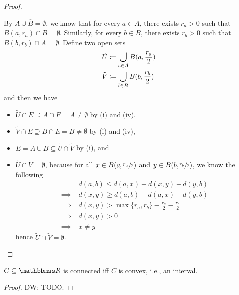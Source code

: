 \documentclass[screen,single]{techreport}
\numberwithin{equation}{section}
\newcommand{\diw}[1]{{\color{Red} DW: #1}}
\begin{document}
\begin{proof}
\begin{itemize}
		By $A \cup \overline{B} = \emptyset$, we know that for every $a \in A$, there exists $r_a > 0$ such that $B(a,r_a) \cap B = \emptyset$.
		Similarly, for every $b \in B$, there exists $r_b > 0$ such that $B(b,r_b) \cap A = \emptyset$.
		Define two open sets
		\begin{align*}
			\tilde{U} & \coloneqq \bigcup_{a \in A} B({a,\frac{r_a}{2}}) \\
			\tilde{V} & \coloneqq \bigcup_{b \in B} B({b,\frac{r_b}{2}})
		\end{align*}
		and then we have
		\begin{itemize}
			\item $\tilde{U} \cap E \supseteq A \cap E  = A \neq \emptyset$ by (i) and (iv),
			\item $\tilde{V} \cap E \supseteq B \cap E = B \neq \emptyset$ by (i) and (iv),
			\item $E = A \cup B \subseteq \tilde{U} \cap \tilde{V}$ by (i), and
			\item $\tilde{U} \cap \tilde{V} = \emptyset$, because for all $x \in B(a,\sfrac{r_a}{2})$ and $y \in B(b,\sfrac{r_b}{2})$, we know the following
			\begin{align*}
				& d(a,b) \le d(a,x) + d(x,y) + d(y,b) \\
				\implies~ & d(x,y) \ge d(a,b) - d(a,x) - d(y,b) \\
				\implies~ & d(x,y) > \max\{r_a,r_b\} - \frac{r_a}{2} - \frac{r_b}{2} \\
				\implies~ & d(x,y) > 0 \\
				\implies~ & x \neq y
			\end{align*}
			hence $\tilde{U} \cap \tilde{V} = \emptyset$.
		\end{itemize}
	\end{itemize}
\end{proof}

\begin{theorem}\label{The:RConnectedConvex}
	$C \subseteq \bbR$ is connected iff $C$ is convex, i.e., an interval.
\end{theorem}
\begin{proof}
	\diw{TODO.}
\end{proof}
\end{document}
